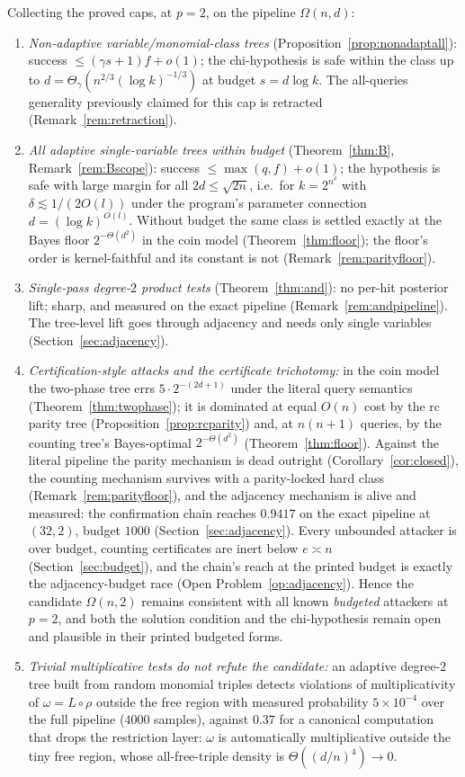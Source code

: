 \documentclass[11pt]{article}
\theoremstyle{definition}
\theoremstyle{remark}
\begin{document}
Collecting the proved caps, at $p=2$, on the pipeline
$\Omega(n,d)$:
\begin{enumerate}
\item \emph{Non-adaptive variable/monomial-class trees}
(Proposition~\ref{prop:nonadaptall}): success
$\le(\gamma s+1)f+o(1)$; the chi-hypothesis is safe within the class
up to $d=\Theta_\gamma(n^{2/3}(\log k)^{-1/3})$ at budget $s=d\log k$.
The all-queries generality previously claimed for this cap is
retracted (Remark~\ref{rem:retraction}).
\item \emph{All adaptive single-variable trees within budget}
(Theorem~\ref{thm:B}, Remark~\ref{rem:Bscope}): success
$\le\max(q,f)+o(1)$; the hypothesis is
safe with large margin for all $2d\le\sqrt{2n}$, i.e.\ for
$k=2^{n^{\delta}}$ with $\delta\lesssim 1/(2O(l))$ under the program's
parameter connection $d=(\log k)^{O(l)}$.  Without budget the same
class is settled exactly at the Bayes floor $2^{-\Theta(d^2)}$ in the
coin model (Theorem~\ref{thm:floor}); the floor's order is
kernel-faithful and its constant is not
(Remark~\ref{rem:parityfloor}).
\item \emph{Single-pass degree-$2$ product tests}
(Theorem~\ref{thm:and}): no per-hit posterior lift; sharp, and
measured on the exact pipeline (Remark~\ref{rem:andpipeline}).  The
tree-level lift goes through adjacency and needs only single
variables (Section~\ref{sec:adjacency}).
\item \emph{Certification-style attacks and the certificate
trichotomy:} in the coin model
the two-phase tree errs $5\cdot 2^{-(2d+1)}$ under the literal query
semantics (Theorem~\ref{thm:twophase}); it is dominated at equal
$O(n)$ cost by the rc parity tree (Proposition~\ref{prop:rcparity})
and, at $n(n+1)$ queries, by the counting tree's Bayes-optimal
$2^{-\Theta(d^2)}$ (Theorem~\ref{thm:floor}).  Against the literal
pipeline the parity mechanism is dead outright
(Corollary~\ref{cor:closed}), the counting mechanism survives with a
parity-locked hard class (Remark~\ref{rem:parityfloor}), and the
adjacency mechanism is alive and measured: the confirmation chain
reaches $0.9417$ on the exact pipeline at $(32,2)$, budget $1000$
(Section~\ref{sec:adjacency}).  Every unbounded attacker is over
budget, counting certificates are inert below $e\asymp n$
(Section~\ref{sec:budget}), and the chain's reach at the printed
budget is exactly the adjacency-budget race
(Open Problem~\ref{op:adjacency}).  Hence the candidate $\Omega(n,2)$ remains
consistent with all known \emph{budgeted} attackers at $p=2$, and both
the solution condition and the chi-hypothesis remain open and
plausible in their printed budgeted forms.
\item \emph{Trivial multiplicative tests do not refute the candidate:}
an adaptive degree-$2$ tree built from random monomial triples detects
violations of multiplicativity of $\omega=L\circ\rho$ outside the free
region with measured probability $5\times10^{-4}$ over the full
pipeline ($4000$ samples), against $0.37$ for a canonical computation
that drops the restriction layer: $\omega$ is automatically
multiplicative outside the tiny free region, whose all-free-triple
density is $\Theta((d/n)^4)\to0$.
\end{enumerate}
\end{document}
